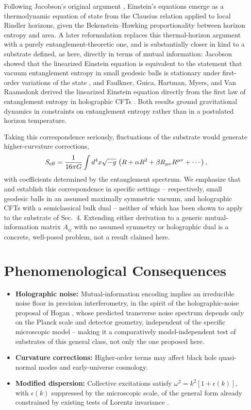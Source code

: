 \documentclass[11pt]{article}
\begin{document}
Following Jacobson's original argument \cite{Jacobson}, Einstein's equations emerge as a thermodynamic equation of state from the Clausius relation applied to local Rindler horizons, given the Bekenstein--Hawking proportionality between horizon entropy and area. A later reformulation replaces this thermal-horizon argument with a purely entanglement-theoretic one, and is substantially closer in kind to a substrate defined, as here, directly in terms of mutual information: Jacobson showed that the linearized Einstein equation is equivalent to the statement that vacuum entanglement entropy in small geodesic balls is stationary under first-order variations of the state \cite{JacobsonEntanglement}, and Faulkner, Guica, Hartman, Myers, and Van Raamsdonk derived the linearized Einstein equation directly from the first law of entanglement entropy in holographic CFTs \cite{Faulkner}. Both results ground gravitational dynamics in constraints on entanglement entropy rather than in a postulated horizon temperature.

Taking this correspondence seriously, fluctuations of the substrate would generate higher-curvature corrections,
\begin{equation}
S_{\rm eff} = \frac{1}{16\pi G} \int d^4x \sqrt{-g}\, \left(R + \alpha R^2 + \beta R_{\mu\nu} R^{\mu\nu} + \cdots \right),
\label{eq:effective-action}
\end{equation}
with coefficients determined by the entanglement spectrum. We emphasize that \cite{JacobsonEntanglement} and \cite{Faulkner} establish this correspondence in specific settings -- respectively, small geodesic balls in an assumed maximally symmetric vacuum, and holographic CFTs with a semiclassical bulk dual -- neither of which has been shown to apply to the substrate of Sec.~4. Extending either derivation to a generic mutual-information matrix $A_{ij}$ with no assumed symmetry or holographic dual is a concrete, well-posed problem, not a result claimed here.

\section{Phenomenological Consequences}

\begin{itemize}
\item \textbf{Holographic noise:} Mutual-information encoding implies an irreducible noise floor in precision interferometry, in the spirit of the holographic-noise proposal of Hogan \cite{Hogan}, whose predicted transverse noise spectrum depends only on the Planck scale and detector geometry, independent of the specific microscopic model -- making it a comparatively model-independent test of substrates of this general class, not only the one proposed here.
\item \textbf{Curvature corrections:} Higher-order terms may affect black hole quasi-normal modes and early-universe cosmology.
\item \textbf{Modified dispersion:} Collective excitations satisfy $\omega^2 = k^2[1+\epsilon(k)]$, with $\epsilon(k)$ suppressed by the microscopic scale, of the general form already constrained by existing tests of Lorentz invariance \cite{Liberati}.
\end{itemize}
\end{document}
